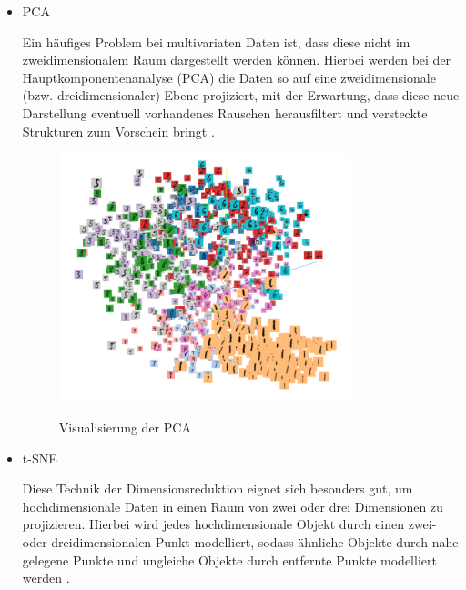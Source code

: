 \begin{itemize} 
\item \gls{PCA} \vspace{10pt}

Ein häufiges Problem bei multivariaten Daten ist, dass diese nicht im zweidimensionalem Raum dargestellt werden können.  Hierbei werden bei der Hauptkomponentenanalyse (PCA) die Daten so auf eine zweidimensionale (bzw. dreidimensionaler) Ebene projiziert, mit der Erwartung, dass diese neue Darstellung eventuell vorhandenes Rauschen herausfiltert und versteckte Strukturen zum Vorschein bringt \cite{pca}.
\begin{figure}[h!]
	\centering
	 \includegraphics[width=0.8\textwidth]{images/Kapitel_3/projektor_pca.png}\\
	\vspace{10pt} 
	\caption[Visualisierung der PCA]{Visualisierung der PCA} \vspace{0.8cm}
	\label{fig:pca}
\end{figure}



\item \gls{t-SNE} \vspace{10pt}

Diese Technik der Dimensionsreduktion eignet sich besonders gut, um hochdimensionale Daten in einen Raum von zwei oder drei Dimensionen zu projizieren. Hierbei wird jedes hochdimensionale Objekt durch einen zwei- oder dreidimensionalen Punkt modelliert, sodass ähnliche Objekte durch nahe gelegene Punkte und ungleiche Objekte durch entfernte Punkte modelliert werden \cite{t-sne}.



\end{itemize}
